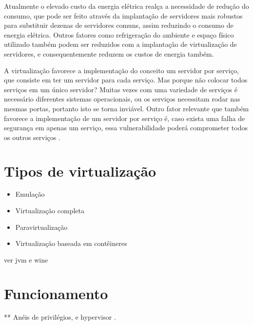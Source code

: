 Atualmente o elevado custo da energia elétrica realça a necessidade de redução do consumo, que pode ser feito através da implantação 
de servidores mais robustos para substituir dezenas de servidores comuns, assim reduzindo o consumo de energia elétrica. 
Outros fatores como refrigeração do ambiente e espaço físico utilizado também podem ser reduzidos com a implantação de virtualização de
servidores, e consequentemente reduzem os custos de energia também.

A virtualização favorece a implementação do conceito um servidor por serviço, que consiste em ter um servidor para cada serviço.
Mas porque não colocar todos serviços em um único servidor? Muitas vezes com uma variedade de serviços é necessário diferentes 
sistemas operacionais, ou os serviços necessitam rodar nas mesmas portas, portanto isto se torna inviável. Outro fator relevante que 
também favorece a implementação de um servidor por serviço é, caso exista uma falha de segurança em apenas um serviço, essa 
vulnerabilidade poderá comprometer todos os outros serviços 
\cite{carissimi2008}.

\section{Tipos de virtualização}

\begin{itemize}
 \item Emulação
 \item Virtualização completa
 \item Paravirtualização
 \item Virtualização baseada em contêineres
\end{itemize}

ver jvm e wine

\section{Funcionamento}

** Anéis de privilégios, e hypervisor \cite{goncalves2009}.



